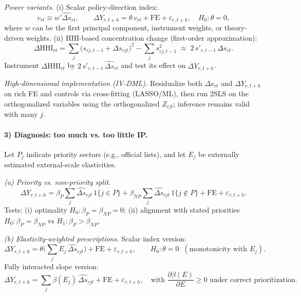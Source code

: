 \documentclass{article}
\begin{document}
\emph{Power variants.} (i) Scalar policy-direction index:
\begin{equation}
    \label{eq:scalar}
    v_{rt} \equiv w' \widehat{\Delta s}_{rt},
    \qquad
    \Delta Y_{r,t+h} = \theta\, v_{rt} + \text{FE} + \varepsilon_{r,t+h},
    \quad H_0:\theta=0,
\end{equation}
where $w$ can be the first principal component, instrument weights, or theory-driven weights.
(ii) HHI-based concentration change (first-order approximation):
\begin{equation}
    \label{eq:hhi}
    \Delta \mathrm{HHI}_{rt}
    = \sum_j \big(s_{rj,t-1}+\Delta s_{rjt}\big)^2 - \sum_j s_{rj,t-1}^2
    \;\approx\; 2\, s'_{r,t-1}\, \Delta s_{rt}.
\end{equation}
Instrument $\Delta \mathrm{HHI}_{rt}$ by $2\, s'_{r,t-1}\, \widehat{\Delta s}_{rt}$ and test its effect on $\Delta Y_{r,t+h}$.

\emph{High-dimensional implementation (IV-DML).}
Residualize both $\Delta s_{rt}$ and $\Delta Y_{r,t+h}$ on rich FE and controls via cross-fitting (LASSO/ML),
then run 2SLS on the orthogonalized variables using the orthogonalized $Z_{rjt}$; inference remains valid with many $j$.

\paragraph{3) Diagnosis: too much vs. too little IP.}
Let $P_j$ indicate priority sectors (e.g., official lists), and let $E_j$ be externally estimated external-scale elasticities.

\emph{(a) Priority vs. non-priority split.}
\begin{equation}
    \label{eq:priority}
    \Delta Y_{r,t+h}
    = \beta_{P}\sum_{j} \widehat{\Delta s}_{rjt}\, 1\{j\in P\}
    + \beta_{NP}\sum_{j} \widehat{\Delta s}_{rjt}\, 1\{j\notin P\}
    + \text{FE} + \varepsilon_{r,t+h}.
\end{equation}
Tests: (i) optimality $H_0:\beta_P=\beta_{NP}=0$; (ii) alignment with stated priorities $H_0:\beta_P=\beta_{NP}$ vs $H_1:\beta_P>\beta_{NP}$.

\emph{(b) Elasticity-weighted prescriptions.}
Scalar index version:
\begin{equation}
    \label{eq:ees_scalar}
    \Delta Y_{r,t+h}
    = \theta \Big( \sum_j E_j\, \widehat{\Delta s}_{rjt} \Big) + \text{FE} + \varepsilon_{r,t+h},
    \qquad H_0:\theta=0 \;\; (\text{monotonicity with } E_j).
\end{equation}
Fully interacted slope version:
\begin{equation}
    \label{eq:ees_interact}
    \Delta Y_{r,t+h}
    = \sum_{j} \beta(E_j)\, \widehat{\Delta s}_{rjt} + \text{FE} + \varepsilon_{r,t+h},
    \quad \text{with } \frac{\partial \beta(E)}{\partial E} \ge 0 \text{ under correct prioritization.}
\end{equation}
\end{document}
